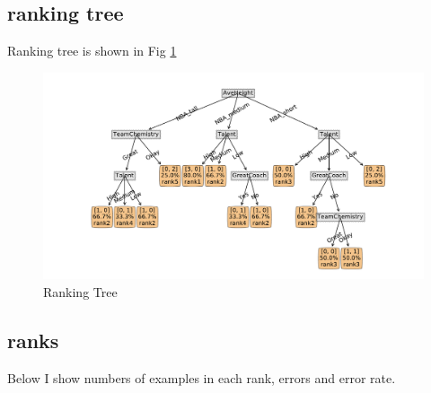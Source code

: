 \documentclass[hw3.tex]{subfiles}
\begin{document}
\subsection{ranking tree}
Ranking tree is shown in Fig \ref{fig:rtree} \\
\begin{figure}[h]
 \centering
 \includegraphics[width=18cm]{./figure_3.pdf}
 \caption{Ranking Tree}
 \label{fig:rtree}
\end{figure}
\subsection{ranks}
Below I show numbers of examples in each rank, errors and error rate.

\end{document}
